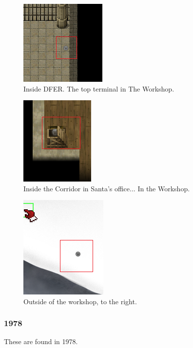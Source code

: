 \documentclass[writeup.tex]{subfiles}
\begin{document}
			\begin{figure}[H]
				\centering
				\includegraphics[scale=1]{"screenshots/coins/Netcoin - Workshop - DFER"}
				\caption{Inside DFER. The top terminal in The Workshop.}
			\end{figure}
			
			\begin{figure}[H]
				\centering
				\includegraphics[scale=1]{"screenshots/coins/Netcoin - Workshop - Santa's Office - The Corridor"}
				\caption{Inside the Corridor in Santa's office... In the Workshop.}
			\end{figure}
			
			\begin{figure}[H]
				\centering
				\includegraphics[scale=1]{"screenshots/coins/Netcoin - Outside of the Workshop, to the right"}
				\caption{Outside of the workshop, to the right.}
			\end{figure}
			
		\subsubsection*{1978}
			These are found in 1978.
			
\end{document}

